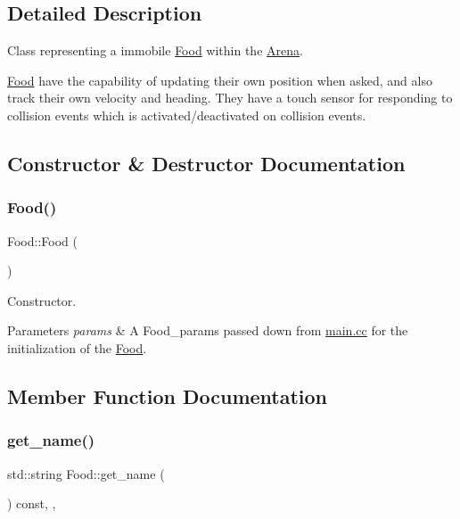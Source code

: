\subsection{Detailed Description}
Class representing a immobile \mbox{\hyperlink{class_food}{Food}} within the \mbox{\hyperlink{class_arena}{Arena}}. 

\mbox{\hyperlink{class_food}{Food}} have the capability of updating their own position when asked, and also track their own velocity and heading. They have a touch sensor for responding to collision events which is activated/deactivated on collision events. 

\subsection{Constructor \& Destructor Documentation}
\mbox{\label{class_food_a75d4d7f76fd495cc8133302ca9fdc485}} 
\subsubsection{\texorpdfstring{Food()}{Food()}}
{\footnotesize\ttfamily Food\+::\+Food (\begin{DoxyParamCaption}{ }\end{DoxyParamCaption})}



Constructor. 


\begin{DoxyParams}{Parameters}
{\em params} & A Food\+\_\+params passed down from \mbox{\hyperlink{main_8cc}{main.\+cc}} for the initialization of the \mbox{\hyperlink{class_food}{Food}}. \\
\hline
\end{DoxyParams}


\subsection{Member Function Documentation}
\mbox{\label{class_food_a5c3bcd5109750a15ebb24b8a2a3cdd07}} 
\subsubsection{\texorpdfstring{get\+\_\+name()}{get\_name()}}
{\footnotesize\ttfamily std\+::string Food\+::get\+\_\+name (\begin{DoxyParamCaption}{ }\end{DoxyParamCaption}) const\hspace{0.3cm}{\ttfamily [inline]}, {\ttfamily [override]}, {\ttfamily [virtual]}}




